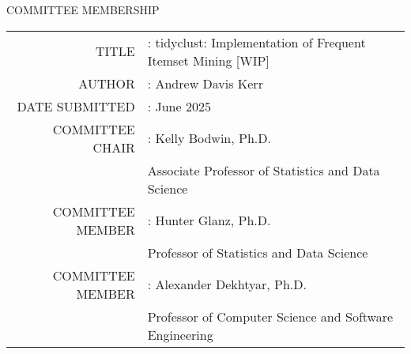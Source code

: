 \begin{center}
COMMITTEE MEMBERSHIP

\vspace{.5in}

\begin{tabular}{r@{}l}
TITLE & : \hspace*{1.5em}tidyclust: Implementation of Frequent Itemset Mining [WIP] \\[.5in]
AUTHOR & : \hspace*{1.5em}Andrew Davis Kerr \\[.5in]
DATE SUBMITTED & : \hspace*{1.5em}June 2025 \\[2in]
COMMITTEE CHAIR & : \hspace*{1.5em}Kelly Bodwin, Ph.D. \\
 & \hspace*{2.2em}Associate Professor of Statistics and Data Science \\[.5in]
COMMITTEE MEMBER & : \hspace*{1.5em}Hunter Glanz, Ph.D. \\
 & \hspace*{2.2em}Professor of Statistics and Data Science \\[.5in]
COMMITTEE MEMBER & : \hspace*{1.5em}Alexander Dekhtyar, Ph.D. \\
 & \hspace*{2.2em}Professor of Computer Science and Software Engineering \\
\end{tabular}
\end{center}
\clearpage